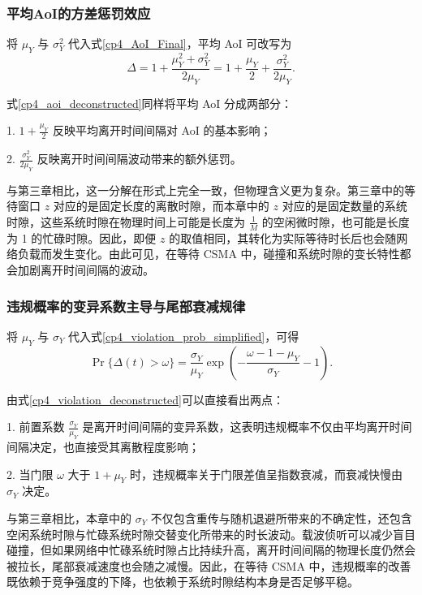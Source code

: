\subsubsection{平均AoI的方差惩罚效应}

将 $\mu_Y$ 与 $\sigma_Y^2$ 代入式\eqref{cp4_AoI_Final}，平均 AoI 可改写为
\begin{equation}\label{cp4_aoi_deconstructed}
    \Delta = 1 + \frac{\mu_Y^2 + \sigma_Y^2}{2\mu_Y}
    = 1 + \frac{\mu_Y}{2} + \frac{\sigma_Y^2}{2\mu_Y}.
\end{equation}

式\eqref{cp4_aoi_deconstructed}同样将平均 AoI 分成两部分：

1. $1 + \frac{\mu_Y}{2}$ 反映平均离开时间间隔对 AoI 的基本影响；

2. $\frac{\sigma_Y^2}{2\mu_Y}$ 反映离开时间间隔波动带来的额外惩罚。

与第三章相比，这一分解在形式上完全一致，但物理含义更为复杂。第三章中的等待窗口 $z$ 对应的是固定长度的离散时隙，而本章中的 $z$ 对应的是固定数量的系统时隙，这些系统时隙在物理时间上可能是长度为 $\frac{1}{M}$ 的空闲微时隙，也可能是长度为 1 的忙碌时隙。因此，即便 $z$ 的取值相同，其转化为实际等待时长后也会随网络负载而发生变化。由此可见，在等待 CSMA 中，碰撞和系统时隙的变长特性都会加剧离开时间间隔的波动。

\subsubsection{违规概率的变异系数主导与尾部衰减规律}

将 $\mu_Y$ 与 $\sigma_Y$ 代入式\eqref{cp4_violation_prob_simplified}，可得
\begin{equation}\label{cp4_violation_deconstructed}
    \Pr\{\Delta(t)>\omega\}=
    \frac{\sigma_Y}{\mu_Y}
    \exp\left(-\frac{\omega-1-\mu_Y}{\sigma_Y}-1\right).
\end{equation}

由式\eqref{cp4_violation_deconstructed}可以直接看出两点：

1. 前置系数 $\frac{\sigma_Y}{\mu_Y}$ 是离开时间间隔的变异系数，这表明违规概率不仅由平均离开时间间隔决定，也直接受其离散程度影响；

2. 当门限 $\omega$ 大于 $1+\mu_Y$ 时，违规概率关于门限差值呈指数衰减，而衰减快慢由 $\sigma_Y$ 决定。

与第三章相比，本章中的 $\sigma_Y$ 不仅包含重传与随机退避所带来的不确定性，还包含空闲系统时隙与忙碌系统时隙交替变化所带来的时长波动。载波侦听可以减少盲目碰撞，但如果网络中忙碌系统时隙占比持续升高，离开时间间隔的物理长度仍然会被拉长，尾部衰减速度也会随之减慢。因此，在等待 CSMA 中，违规概率的改善既依赖于竞争强度的下降，也依赖于系统时隙结构本身是否足够平稳。

